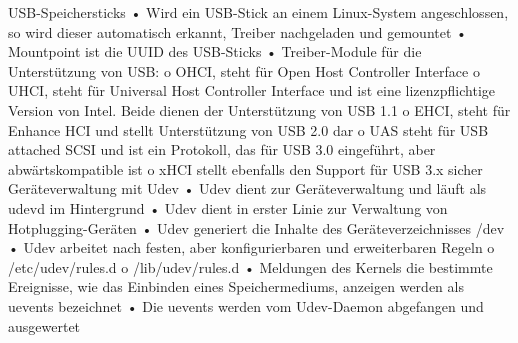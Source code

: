 USB-Speichersticks
• Wird ein USB-Stick an einem Linux-System angeschlossen, so wird dieser automatisch
erkannt, Treiber nachgeladen und gemountet
• Mountpoint ist die UUID des USB-Sticks
• Treiber-Module für die Unterstützung von USB:
o OHCI, steht für Open Host Controller Interface
o UHCI, steht für Universal Host Controller Interface und ist eine lizenzpflichtige
Version von Intel. Beide dienen der Unterstützung von USB 1.1
o EHCI, steht für Enhance HCI und stellt Unterstützung von USB 2.0 dar
o UAS steht für USB attached SCSI und ist ein Protokoll, das für USB 3.0 eingeführt,
aber abwärtskompatible ist
o xHCI stellt ebenfalls den Support für USB 3.x sicher
Geräteverwaltung mit Udev
• Udev dient zur Geräteverwaltung und läuft als udevd im Hintergrund
• Udev dient in erster Linie zur Verwaltung von Hotplugging-Geräten
• Udev generiert die Inhalte des Geräteverzeichnisses /dev
• Udev arbeitet nach festen, aber konfigurierbaren und erweiterbaren Regeln
o /etc/udev/rules.d
o /lib/udev/rules.d
• Meldungen des Kernels die bestimmte Ereignisse, wie das Einbinden eines Speichermediums,
anzeigen werden als uevents bezeichnet
• Die uevents werden vom Udev-Daemon abgefangen und ausgewertet 